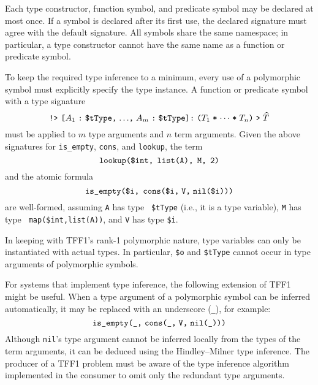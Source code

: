 Each type constructor, function symbol, and predicate symbol may be declared at
most once. If a symbol is declared after its first use, the declared signature
must agree with the default signature. All symbols share the same namespace; in
particular, a type constructor cannot have the same name as a function or
predicate symbol.


 To keep the required type
inference to a minimum, every use of a polymorphic symbol must explicitly
specify the type instance. A function or predicate symbol with a type signature
\[\hbox{{\tt !>} {\tt [$A_1$\;:\;\$tType,\;${\dots}$,\;$A_m$\;:\;\$tType]:\;%
($T_1$\;*\;${\cdots}$\;*\;$T_n$)\;>\;$\widehat T$}}\]
must be applied to $m$ type arguments and $n$ term arguments. Given the above
signatures for {\tt is\_empty}, {\tt cons}, and {\tt lookup}, the term
\[\hbox{\tt lookup(\$int,\;\,list(A),\;\,M,\;\,2)}\]
and the atomic formula
\[\hbox{\tt is\_empty(\$i,\;\,cons(\$i,\;V,\;nil(\$i)))}\]
are well-formed, assuming {\tt A} has type {\tt
\$tType} (i.e., it is a type variable), {\tt M} has type {\tt
map(\$int,\;list(A))}, and {\tt V} has type {\tt \$i}.

In keeping with TFF1's rank-1 polymorphic nature, type variables can only be
instantiated with actual types. In particular, \verb+$o+ and \verb+$tType+
cannot occur in type arguments of polymorphic symbols.

For systems that implement type inference, the following extension
of TFF1 might be useful. When a type argument of
a polymorphic symbol can be inferred automatically, it may be
replaced with an underscore ({\tt \_}), for example:
\[\hbox{{\tt is\_empty(\_,} {\tt cons(\_,\;V,\;nil(\_)))}}\]
Although {\tt nil}'s type argument cannot be inferred locally from the types of
the term arguments, it can be deduced using the Hindley--Milner type inference.
The producer of a TFF1 problem must be aware of the type inference algorithm
implemented in the consumer to omit only the redundant type arguments.

